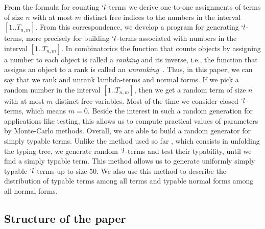 \documentclass{jfp1}
\begin{document}
From the formula for counting $`l$-terms we derive one-to-one assignments of terms of
size $n$ with at most $m$ distinct free indices to the numbers in the interval
$[1..T_{n,m}]$.  From this correspondence, we develop a program for generating
$`l$-terms, more precisely for building $`l$-terms associated with numbers in the
interval $[1..T_{n,m}]$.  In combinatorics the function that counts objects by
assigning a number to each object is called a \emph{ranking} and its inverse, i.e.,
the function that assigns an object to a rank is called an
\emph{unranking}~\cite{integer:ranking}.  Thus, in this paper, we can say that we rank and unrank
lambda-terms and normal forms.  If we pick a random number in the interval
$[1..T_{n,m}]$, then we get a random term of size $n$ with at most $m$ distinct free
variables.  Most of the time we consider closed $`l$-terms, which means $m=0$.
Beside the interest in such a random generation for applications like testing, this
allows us to compute practical values of parameters by Monte-Carlo methods.  Overall,
we are able to build a random generator for simply typable terms. Unlike the method
used so far \cite{Palka:2011:TOC:1982595.1982615}, which consists in unfolding the
typing tree, we generate random \mbox{$`l$-terms} and test their typability, until we
find a simply typable term.  This method allows us to generate uniformly simply
typable $`l$-terms up to size $50$.  We also use this method to describe the
distribution of typable terms among all terms and typable normal forms among all
normal forms.


\subsection*{Structure of the paper}
\label{sec:structure-ther-paper}
\end{document}
